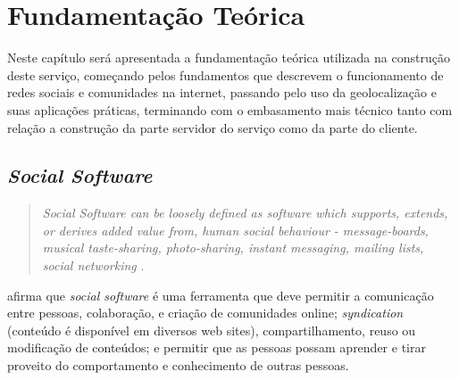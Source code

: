 \documentclass[diss]{template/setrem}
\begin{document}
\chapter{Fundamentação Teórica}
\label{chapter:fundamentacaoteorica}
Neste capítulo será apresentada a fundamentação teórica utilizada na construção deste serviço, começando pelos fundamentos que descrevem o funcionamento de redes sociais e comunidades na internet, passando pelo uso da geolocalização e suas aplicações práticas, terminando com o embasamento mais técnico tanto com relação a construção da parte servidor do serviço como da parte do cliente.

\section{\textit{Social Software}}
\label{sec:socialsoftware}
\begin{quotation}
\emph{Social Software can be loosely defined as software which supports, extends, or derives added value from, human social behaviour - message-boards, musical taste-sharing, photo-sharing, instant messaging, mailing lists, social networking} \citep{Coates2005}.
\end{quotation}

\citet{Farkas2007} afirma que \emph{social software} é uma ferramenta que deve permitir a comunicação entre pessoas, colaboração, e criação de comunidades online; \emph{syndication} (conteúdo é disponível em diversos web sites), compartilhamento, reuso ou modificação de conteúdos; e permitir que as pessoas possam aprender e tirar proveito do comportamento e conhecimento de outras pessoas.
\end{document}
